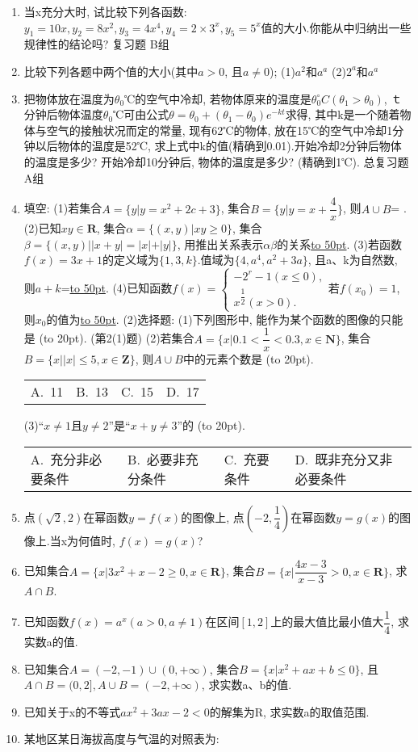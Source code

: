 \documentclass[10pt,a4paper]{article}
\newcommand{\blank}[1]{\underline{\hbox to #1pt{}}}
\newcommand{\bracket}[1]{(\hbox to #1pt{})}
\newcommand{\fourch}[4]{\par\begin{tabular}{p{.23\textwidth}p{.23\textwidth}p{.23\textwidth}p{.23\textwidth}}
A.~#1 &B.~#2& C.~#3& D.~#4
\end{tabular}}
\begin{document}
\begin{enumerate}[1.]
\item 当x充分大时, 试比较下列各函数: $y_1=10x,y_2=8x^2,y_3=4x^4,y_4=2\times 3^x,y_5=5^x$值的大小.你能从中归纳出一些规律性的结论吗?
复习题
B组
\item 比较下列各题中两个值的大小(其中$a>0$, 且$a\ne 0$);
(1)$a^2$和$a^a$							(2)$2^a$和$a^a$
\item 把物体放在温度为$\theta _0$℃的空气中冷却, 若物体原来的温度是$\theta _0^\circ C(\theta _1>\theta _0)$, ｔ分钟后物体温度$\theta _0$℃可由公式$\theta =\theta _0+(\theta _1-\theta _0)e^{-kt}$求得, 其中k是一个随着物体与空气的接触状况而定的常量, 现有62℃的物体, 放在15℃的空气中冷却1分钟以后物体的温度是52℃, 求上式中k的值(精确到0.01).开始冷却2分钟后物体的温度是多少? 开始冷却10分钟后, 物体的温度是多少? (精确到1℃).
总复习题
A组
\item 填空:
(1)若集合$A=\{y|y=x^2+2c+3\}$, 集合$B=\{y|y=x+\dfrac 4x\}$, 则$A\cup B$=		.
(2)已知$xy\in \mathbf{R}$, 集合$\alpha =\{(x,y)|xy\ge 0\}$, 集合$\beta =\{(x,y)||x+y|=|x|+|y|\}$, 用推出关系表示$\alpha \beta$的关系\blank{50}.
(3)若函数$f(x)=3x+1$的定义域为$\{1,3,k\}$.值域为$\{4,a^4,a^2+3a\}$, 且a、k为自然数, 则$a+k$=\blank{50}.
(4)已知函数$f(x)=\begin{cases} -2^r-1(x\le 0), \\ x^{\dfrac 12}(x>0). \end{cases}$若$f(x_0)=1$, 则$x_0$的值为\blank{50}.
(2)选择题:
(1)下列图形中, 能作为某个函数的图像的只能是						\bracket{20}.
(第2(1)题)
(2)若集合$A=\{x|0.1<\dfrac 1x<0.3,x\in \mathbf{N}\}$, 集合$B=\{x||x|\le 5,x\in \mathbf{Z}\}$, 则$A\cup B$中的元素个数是															\bracket{20}.
\fourch{11}{13}{15}{17}
(3)``$x\ne 1$且$y\ne 2$''是``$x+y\ne 3$''的								\bracket{20}.
\fourch{充分非必要条件}{必要非充分条件}{充要条件}{既非充分又非必要条件}
\item 点$(\sqrt 2,2)$在幂函数$y=f(x)$的图像上, 点$(-2,\dfrac 14)$在幂函数$y=g(x)$的图像上.当x为何值时, $f(x)=g(x)$?
\item 已知集合$A=\{x|3x^2+x-2\ge 0,x\in \mathbf{R}\}$, 集合$B=\{x|\dfrac{4x-3}{x-3}>0,x\in \mathbf{R}\}$, 求$A\cap B$.
\item 已知函数$f(x)=a^x(a>0,a\ne 1)$在区间$[1,2]$上的最大值比最小值大$\dfrac 14$, 求实数a的值.
\item 已知集合$A=(-2,-1)\cup (0,+\infty)$, 集合$B=\{x|x^2+ax+b\le 0\}$, 且$A\cap B=(0,2],A\cup B=(-2,+\infty)$, 求实数a、b的值.
\item 已知关于x的不等式$ax^2+3ax-2<0$的解集为R, 求实数a的取值范围.
\item 某地区某日海拔高度与气温的对照表为:

\end{enumerate}
\end{document}

